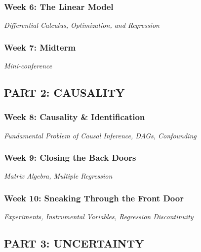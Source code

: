 \documentclass[11pt, letterpaper]{article}
\begin{document}
\subsubsection*{Week 6: The Linear Model}
\textit{Differential Calculus, Optimization, and Regression}



\subsubsection*{Week 7: Midterm}
\textit{Mini-conference}

\subsection*{PART 2: CAUSALITY}

\subsubsection*{Week 8: Causality \& Identification}
\textit{Fundamental Problem of Causal Inference, DAGs, Confounding}

\subsubsection*{Week 9: Closing the Back Doors}
\textit{Matrix Algebra, Multiple Regression}

\subsubsection*{Week 10: Sneaking Through the Front Door}
\textit{Experiments, Instrumental Variables, Regression Discontinuity}

\subsection*{PART 3: UNCERTAINTY}
\end{document}
